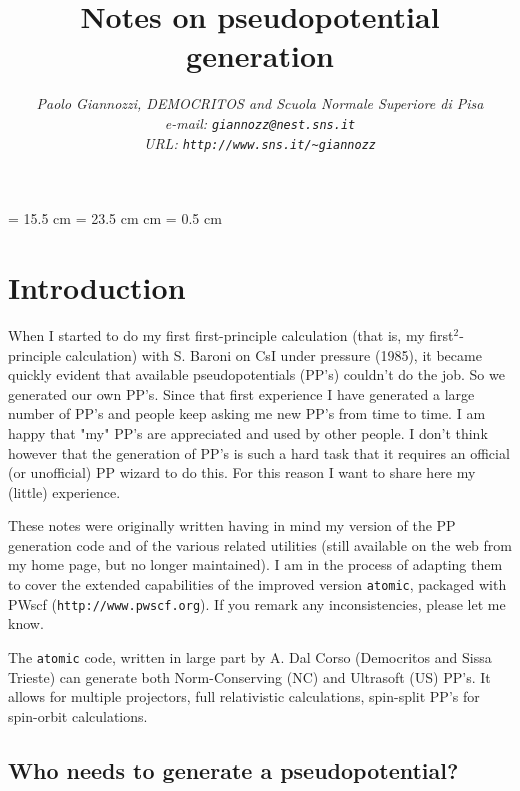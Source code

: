 \pagestyle{empty}
\textwidth = 15.5 cm
\textheight = 23.5 cm
 cm
\oddsidemargin = 0.5 cm
\listparindent=0pt
\itemsep=5pt
\def\r{{\bf r}}
 
\title{Notes on pseudopotential generation}
\author{\em Paolo Giannozzi, DEMOCRITOS and Scuola Normale Superiore di Pisa\\
e-mail: {\tt giannozz@nest.sns.it}\\
URL: {\tt http://www.sns.it/\~{}giannozz}}
\maketitle

\section{Introduction} 

When I started to do my first first-principle calculation
(that is, my first$^2$-principle calculation) with S. Baroni
on CsI under pressure (1985), it became quickly evident that
available pseudopotentials (PP's) couldn't do the job. So we 
generated our own PP's. Since that first experience I have 
generated a large number of PP's and people keep asking me 
new PP's from time to time. I am happy that "my" PP's are 
appreciated and used by other people. I don't think however 
that the generation of PP's is such a hard task that it requires 
an official (or unofficial) PP wizard to do this. For this reason 
I want to share here my (little) experience.

These notes were originally written having in mind my version
of the PP generation code and of the various related utilities
(still available on the web from my home page, but no longer 
maintained). I am in the process of adapting them to cover the
extended capabilities of the improved version {\tt atomic}, 
packaged with PWscf ({\tt http://www.pwscf.org}). If you remark 
any inconsistencies, please let me know.

The {\tt atomic} code, written in large part by A. Dal Corso
(Democritos and Sissa Trieste) can generate both 
Norm-Conserving (NC) \cite{NC} and Ultrasoft (US) \cite{van} PP's.
It allows for multiple projectors, full relativistic calculations,
spin-split PP's for spin-orbit calculations.

\subsection{Who needs to generate a pseudopotential?}

